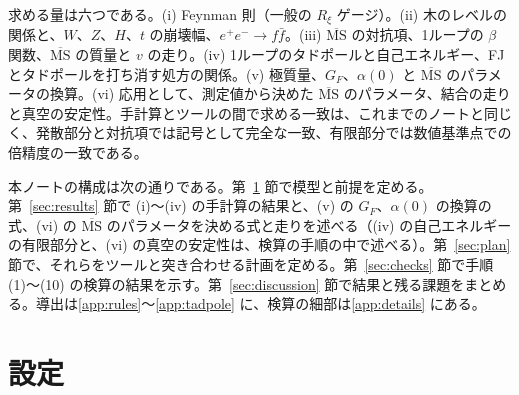\documentclass[a4paper,10pt]{ltjsarticle}
\newcommand{\MSbar}{\overline{\mathrm{MS}}}
\begin{document}
求める量は六つである。(i) Feynman 則（一般の $R_\xi$ ゲージ）。(ii) 木のレベルの関係と、$W$、$Z$、$H$、$t$ の崩壊幅、$e^+e^-\to f\bar f$。(iii) $\MSbar$ の対抗項、1ループの $\beta$ 関数、$\MSbar$ の質量と $v$ の走り。(iv) 1ループのタドポールと自己エネルギー、FJ とタドポールを打ち消す処方の関係。(v) 極質量、$G_F$、$\alpha(0)$ と $\MSbar$ のパラメータの換算。(vi) 応用として、測定値から決めた $\MSbar$ のパラメータ、結合の走りと真空の安定性。手計算とツールの間で求める一致は、これまでのノートと同じく、発散部分と対抗項では記号として完全な一致、有限部分では数値基準点での倍精度の一致である。

本ノートの構成は次の通りである。第~\ref{sec:setup} 節で模型と前提を定める。第~\ref{sec:results} 節で (i)〜(iv) の手計算の結果と、(v) の $G_F$、$\alpha(0)$ の換算の式、(vi) の $\MSbar$ のパラメータを決める式と走りを述べる（(iv) の自己エネルギーの有限部分と、(vi) の真空の安定性は、検算の手順の中で述べる）。第~\ref{sec:plan} 節で、それらをツールと突き合わせる計画を定める。第~\ref{sec:checks} 節で手順 (1)〜(10) の検算の結果を示す。第~\ref{sec:discussion} 節で結果と残る課題をまとめる。導出は\ref{app:rules}〜\ref{app:tadpole} に、検算の細部は\ref{app:details} にある。

\section{設定}\label{sec:setup}
\end{document}
